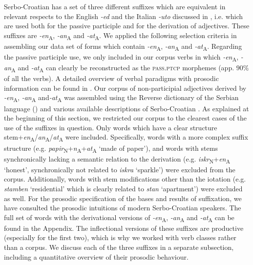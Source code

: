 \documentclass[output=paper]{langsci/langscibook}
\begin{document}
Serbo-Croatian has a set of three different suffixes which are equivalent in relevant respects to the English \textit{-ed} and the Italian \textit{-uto }discussed in , i.e. which are used both for the passive participle and for the derivation of adjectives. These suffixes are \textit{-en}\textsubscript{A}, \textit{-an}\textsubscript{A} and \textit{-at}\textsubscript{A}. 
We applied the following selection criteria in assembling our data set of forms which contain \textit{{-en}}\textsubscript{A}, \textit{{-an}}\textsubscript{A} and \textit{{-at}}\textsubscript{A}. Regarding the passive participle use, we only included in our corpus verbs in which \textit{{-en}}\textsubscript{A}, \textit{{-an}}\textsubscript{A} and \textit{{-at}}\textsubscript{A} can clearly be reconstructed as the \textsc{pass.ptcp} morphemes (app. $90\%$  of all the verbs). A detailed overview of verbal paradigms with prosodic information can be found in \citet{Klaic2013}. 
Our corpus of non-participial adjectives derived by  \textit{{-en}}\textsubscript{A}, \textit{{-an}}\textsubscript{A} and\textit{ {-at}}\textsubscript{A} was assembled using the Reverse dictionary of the Serbian language 
(\citealt{Nik2000}) and various available descriptions of Serbo-Croatian 
\citep{Bab2002, Ste1979, Bar1995}. 
As explained at the beginning of this section, we restricted our corpus to the clearest cases of the use of the suffixes in question. Only words which have a clear structure stem+\textit{en}\textsubscript{A}/\textit{an}\textsubscript{A}/\textit{at}\textsubscript{A} were included. Specifically, words with a more complex suffix structure (e.g. \textit{papir}\textsubscript{N}+\textit{n}\textsubscript{A}+\textit{at}\textsubscript{A} `made of paper'), and words with stems synchronically lacking a semantic relation to the derivation (e.g. \textit{iskr}\textsubscript{N}+\textit{en}\textsubscript{A} `honest', synchronically not related to \textit{iskra} `sparkle') were excluded from the corpus. Additionally, words with stem modifications other than the iotation (e.g. \textit{stamben} `residential' which is clearly related to \textit{stan} `apartment') were excluded as well.
For the prosodic specification of the bases and results of suffixation, we have consulted the prosodic intuitions of modern Serbo-Croatian speakers. The full set of words with the derivational versions of \textit{-en}\textsubscript{A}, \textit{-an}\textsubscript{A} and \textit{-at}\textsubscript{A} can be found in the Appendix. The inflectional versions of these suffixes are productive (especially for the first two), which is why we worked with verb classes rather than a corpus. 
We discuss each of the three suffixes in a separate subsection, including a quantitative overview of their prosodic behaviour.
\end{document}
